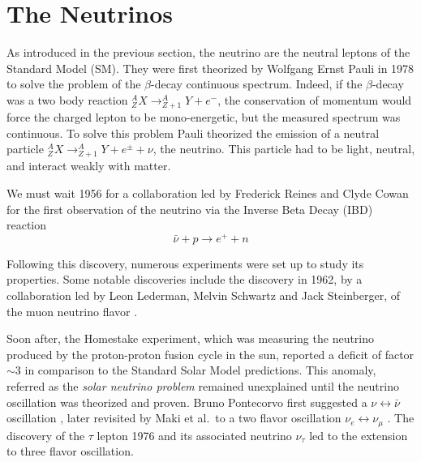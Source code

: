 \documentclass[../main.tex]{subfiles}
\begin{document}
\section{The Neutrinos}
\label{sec:neutrino:th}

As introduced in the previous section, the neutrino are the neutral leptons of the Standard Model (SM). They were first theorized by Wolfgang Ernst Pauli in 1978 \cite{pauli_dear_1978} to solve the problem of the $\beta$-decay continuous spectrum. Indeed, if the $\beta$-decay was a two body reaction $^A_Z X \rightarrow ^A_{Z + 1}Y + e^{-}$, the conservation of momentum would force the charged lepton to be mono-energetic, but the measured spectrum was continuous. To solve this problem Pauli theorized the emission of a neutral particle $^A_Z X \rightarrow ^A_{Z + 1}Y + e^{\pm} + \nu$, the neutrino. This particle had to be light, neutral, and interact weakly with matter.

We must wait 1956 for a collaboration led by Frederick Reines and Clyde Cowan for the first observation of the neutrino \cite{reines_neutrino_1956, cowan_detection_1956} via the Inverse Beta Decay (IBD) reaction
\begin{equation}
  \bar{\nu} + p \rightarrow e^+ + n
\end{equation}

Following this discovery, numerous experiments were set up to study its properties. Some notable discoveries include the discovery in 1962, by a collaboration led by Leon Lederman, Melvin Schwartz and Jack Steinberger, of the muon neutrino flavor \cite{danby_observation_1962}.

Soon after, the Homestake experiment, which was measuring the neutrino produced by the proton-proton fusion cycle in the sun, reported a deficit of factor $\sim 3$ \cite{davis_review_1994} in comparison to the Standard Solar Model predictions. This anomaly, referred as the \textit{solar neutrino problem} remained unexplained until the neutrino oscillation was theorized and proven. Bruno Pontecorvo first suggested a $\nu \leftrightarrow \bar{\nu}$ oscillation \cite{pontecorvo_mesonium_1957}, later revisited by Maki et al.\ to a two flavor oscillation $\nu_e \leftrightarrow \nu_\mu$ \cite{maki_remarks_1962}. The discovery of the $\tau$ lepton 1976 \cite{perl_evidence_1975} and its associated neutrino $\nu_\tau$ \cite{kodama_observation_2001} led to the extension to three flavor oscillation.
\end{document}

